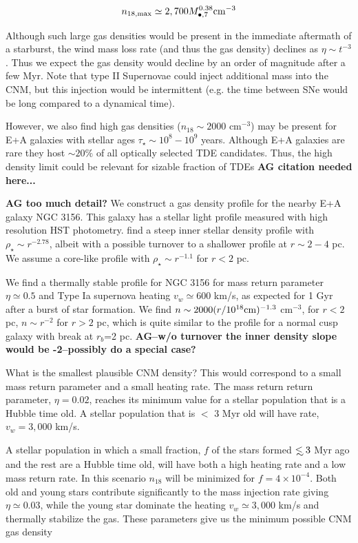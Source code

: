 \documentclass[usenatbib,fleqn]{mn2e}
\newcommand\lsim{\mathrel{\rlap{\lower4pt\hbox{\hskip1pt$\sim$}}
    \raise1pt\hbox{$<$}}}
\newcommand{\Mbh}[1][]{M_{\bullet#1}}
\begin{document}
\begin{equation}
n_{\rm 18,max} \simeq 2,700 \Mbh[,7]^{0.38} {\rm cm^{-3}}
\label{eq:n18max}
\end{equation}

Although such large gas densities would be present in the immediate
aftermath of a starburst, the wind mass loss rate (and thus the gas
density) declines as $\eta \sim t^{-3}$. Thus we expect the gas density would
decline by an order of magnitude after a few Myr. Note that type II
Supernovae could inject additional mass into the CNM, but this
injection would be intermittent (e.g. the time between SNe would be
long compared to a dynamical time).

However, we also find high gas densities ($n_{18}\sim 2000$ cm$^{-3}$)
may be present for E+A galaxies with stellar ages $\tau_\star\sim
10^8-10^9$ years. Although E+A galaxies are rare they host $\sim 20
\%$ of all optically selected TDE candidates. Thus, the high density
limit could be relevant for sizable fraction of TDEs {\bf AG citation
  needed here...}

{\bf AG too much detail?} We construct a gas density profile for the
nearby E+A galaxy NGC 3156. This galaxy has a stellar light profile
measured with high resolution HST photometry. \citealt{Krajnovic+2013}
find a steep inner stellar density profile with $\rho_\star\sim
r^{-2.78}$, albeit with a possible turnover to a shallower profile at
$r \sim 2-4$ pc. We assume a core-like profile with $\rho_\star \sim
r^{-1.1}$ for $r<2$ pc.

We find a thermally stable profile for NGC 3156 for mass
return parameter $\eta\simeq0.5$ and Type Ia supernova heating
$v_w\simeq600 $ km/s, as expected for 1 Gyr after a burst of star
formation. We find $n \sim 2000 (r/10^{18} {\rm cm})^{-1.3}$
cm$^{-3}$, for $r<2$ pc, $n\sim r^{-2}$ for $r>2$ pc, which is quite
similar to the profile for a normal cusp galaxy with break at $r_b$=2
pc. {\bf AG--w/o turnover the inner density slope would be -2--possibly
do a special case?}

What is the smallest plausible CNM density? This would correspond to a
small mass return parameter and a small heating rate. The mass return
return parameter, $\eta=0.02$, reaches its minimum value for a stellar
population that is a Hubble time old. A stellar population
that is $<$ 3 Myr old will have rate, $v_w=3,000$ km/s.

A stellar population in which a small fraction, $f$ of the stars
formed $\lsim 3$ Myr ago and the rest are a Hubble time old, will have
both a high heating rate and a low mass return rate. In this scenario
$n_{18}$ will be minimized for $f=4\times 10^{-4}$. Both old and young
stars contribute significantly to the mass injection rate giving
$\eta\simeq 0.03$, while the young star dominate the heating
$v_w\simeq 3,000$ km/s and thermally stabilize the gas. These
parameters give us the minimum possible CNM gas density
\end{document}
